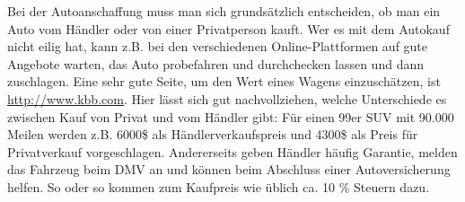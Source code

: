 \documentclass[a4paper]{scrreprt}
\begin{document}
Bei der Autoanschaffung muss man sich grundsätzlich entscheiden, ob man ein Auto vom Händler oder von einer Privatperson kauft. Wer es mit dem Autokauf nicht eilig hat, kann z.B. bei den verschiedenen Online-Plattformen auf gute Angebote warten, das Auto probefahren und durchchecken lassen und dann zuschlagen. Eine sehr gute Seite, um den Wert eines Wagens einzuschätzen, ist \url{http://www.kbb.com}. Hier lässt sich gut nachvollziehen, welche Unterschiede es zwischen Kauf von Privat und vom Händler gibt: Für einen 99er SUV mit 90.000 Meilen werden z.B. 6000\$ als Händlerverkaufspreis und 4300\$ als Preis für Privatverkauf vorgeschlagen. Andererseits geben Händler häufig Garantie, melden das Fahrzeug beim DMV an und können beim Abschluss einer Autoversicherung helfen. So oder so kommen zum Kaufpreis wie üblich ca. 10 \% Steuern dazu.
\end{document}
